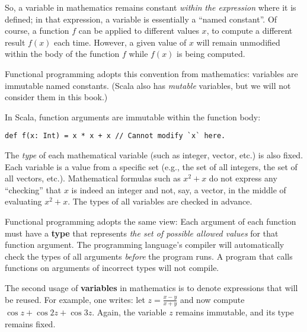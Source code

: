 So, a variable in mathematics remains constant \emph{within} \emph{the
expression} where it is defined; in that expression, a variable is
essentially a \textsf{``}named constant\textsf{''}. Of course, a function $f$ can
be applied to different values $x$, to compute a different result
$f(x)$ each time. However, a given value of $x$ will remain unmodified
within the body of the function $f$ while $f(x)$ is being computed.

Functional programming adopts this convention from mathematics: variables
are immutable named constants. (Scala also has \emph{mutable} variables,
but we will not consider them in this book.)

In Scala, function arguments are immutable within the function body:
\begin{lstlisting}
def f(x: Int) = x * x + x // Cannot modify `x` here.
\end{lstlisting}

The \emph{type} of each mathematical variable (such as integer, vector,
etc.) is also fixed. Each variable is a value from a specific set
(e.g., the set of all integers, the set of all vectors, etc.). Mathematical
formulas such as $x^{2}+x$ do not express any \textsf{``}checking\textsf{''} that
$x$ is indeed an integer and not, say, a vector, in the middle of
evaluating $x^{2}+x$. The types of all variables are checked in advance.

Functional programming adopts the same view: Each argument of each
function must have a \textbf{type} that represents \emph{the
set of possible allowed values} for that function argument. The programming
language\textsf{'}s compiler will automatically check the types of all arguments
\emph{before} the program runs. A program that calls functions on
arguments of incorrect types will not compile.

The second usage of \textbf{variables} in mathematics
is to denote expressions that will be reused. For example, one writes:
let $z=\frac{x-y}{x+y}$ and now compute $\cos z+\cos2z+\cos3z$.
Again, the variable $z$ remains immutable, and its type remains fixed.

